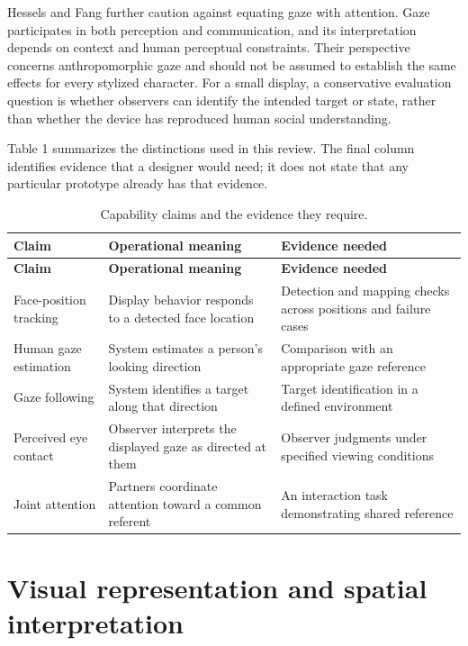 \documentclass[11pt,a4paper]{article}
\begin{document}
Hessels and Fang \cite{r3} further caution against equating gaze with attention. Gaze participates in both perception and communication, and its interpretation depends on context and human perceptual constraints. Their perspective concerns anthropomorphic gaze and should not be assumed to establish the same effects for every stylized character. For a small display, a conservative evaluation question is whether observers can identify the intended target or state, rather than whether the device has reproduced human social understanding.

Table 1 summarizes the distinctions used in this review. The final column identifies evidence that a designer would need; it does not state that any particular prototype already has that evidence.

{\small
\begin{longtable}{@{}>{\raggedright\arraybackslash}p{}>{\raggedright\arraybackslash}p{}>{\raggedright\arraybackslash}p{}@{}}
\caption{Capability claims and the evidence they require.}\\
\toprule
\textbf{Claim} & \textbf{Operational meaning} & \textbf{Evidence needed} \\
\midrule
\endfirsthead
\toprule
\textbf{Claim} & \textbf{Operational meaning} & \textbf{Evidence needed} \\
\midrule
\endhead
\bottomrule
\endfoot
Face-position tracking & Display behavior responds to a detected face location & Detection and mapping checks across positions and failure cases \\[0.45em]
Human gaze estimation & System estimates a person's looking direction & Comparison with an appropriate gaze reference \\[0.45em]
Gaze following & System identifies a target along that direction & Target identification in a defined environment \\[0.45em]
Perceived eye contact & Observer interprets the displayed gaze as directed at them & Observer judgments under specified viewing conditions \\[0.45em]
Joint attention & Partners coordinate attention toward a common referent & An interaction task demonstrating shared reference \\[0.45em]
\end{longtable}
}

\section{Visual representation and spatial interpretation}
\end{document}
